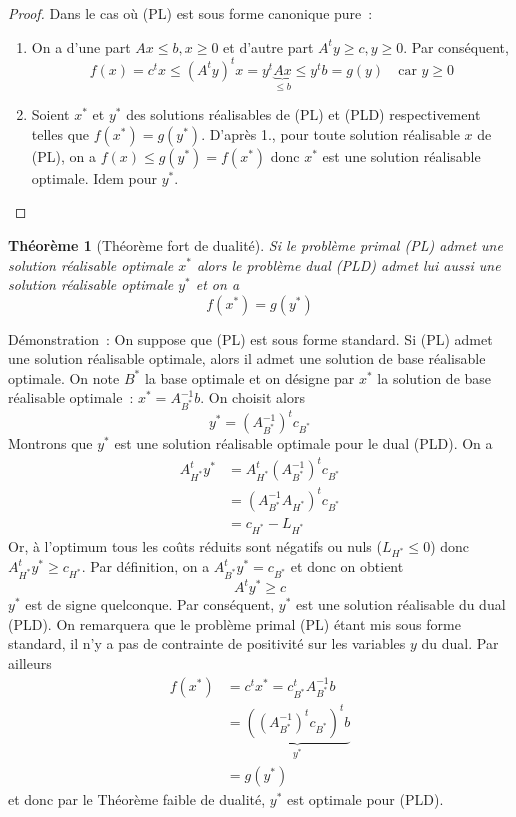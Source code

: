 \documentclass[a4paper,12pt,openany]{book}
\theoremstyle{plain}
\newtheorem{theorem}{Théorème}[section]
\theoremstyle{definition}
\theoremstyle{remark}
\theoremstyle{nbstyle}
\begin{document}
	\begin{proof}
		Dans le cas où (PL) est sous forme canonique pure~:
		
		\begin{enumerate}
			\item On a d'une part $A x \leq b, x \geq 0$ et d'autre part $A^{t} y \geq c, y \geq 0$. Par conséquent,
			\[
			f(x)=c^{t} x \leq (A^{t} y)^{t} x = y^{t} \underbrace{A x}_{\leq b} \leq y^{t} b = g(y) \quad \text{car } y \geq 0
			\]
			\item Soient $x^{*}$ et $y^{*}$ des solutions réalisables de (PL) et (PLD) respectivement telles que $f(x^{*})=g(y^{*})$. D'après 1., pour toute solution réalisable $x$ de (PL), on a $f(x) \leq g(y^{*})=f(x^{*})$ donc $x^{*}$ est une solution réalisable optimale. Idem pour $y^{*}$.
		\end{enumerate}
	\end{proof}
	
	\begin{theorem}[Théorème fort de dualité]
		Si le problème primal (PL) admet une solution réalisable optimale $x^{*}$ alors le problème dual (PLD) admet lui aussi une solution réalisable optimale $y^{*}$ et on a
		\[
		f(x^{*}) = g(y^{*})
		\]
	\end{theorem}
	
	Démonstration~: On suppose que (PL) est sous forme standard. Si (PL) admet une solution réalisable optimale, alors il admet une solution de base réalisable optimale. On note $B^{*}$ la base optimale et on désigne par $x^{*}$ la solution de base réalisable optimale~: $x^{*}=A_{B^{*}}^{-1} b$. On choisit alors
	\[
	y^{*} = \left(A_{B^{*}}^{-1}\right)^{t} c_{B^{*}}
	\]
	Montrons que $y^{*}$ est une solution réalisable optimale pour le dual (PLD). On a
	\[
	\begin{aligned}
	A_{H^{*}}^{t} y^{*} & = A_{H^{*}}^{t} \left(A_{B^{*}}^{-1}\right)^{t} c_{B^{*}} \\
	& = \left(A_{B^{*}}^{-1} A_{H^{*}}\right)^{t} c_{B^{*}} \\
	& = c_{H^{*}} - L_{H^{*}}
	\end{aligned}
	\]
	Or, à l'optimum tous les coûts réduits sont négatifs ou nuls ($L_{H^{*}} \leq 0$) donc $A_{H^{*}}^{t} y^{*} \geq c_{H^{*}}$. Par définition, on a $A_{B^{*}}^{t} y^{*} = c_{B^{*}}$ et donc on obtient
	\[
	A^{t} y^{*} \geq c
	\]
	$y^{*}$ est de signe quelconque. Par conséquent, $y^{*}$ est une solution réalisable du dual (PLD). On remarquera que le problème primal (PL) étant mis sous forme standard, il n'y a pas de contrainte de positivité sur les variables $y$ du dual. Par ailleurs
	\[
	\begin{aligned}
	f(x^{*}) & = c^{t} x^{*} = c_{B^{*}}^{t} A_{B^{*}}^{-1} b \\
	& = \underbrace{\left(\left(A_{B^{*}}^{-1}\right)^{t} c_{B^{*}}\right)^{t} b}_{y^{*}} \\
	& = g(y^{*})
	\end{aligned}
	\]
	et donc par le Théorème faible de dualité, $y^{*}$ est optimale pour (PLD).
	
\end{document}
